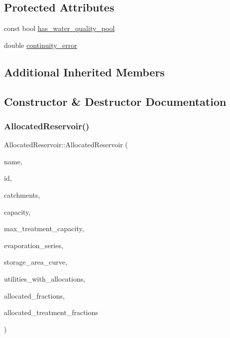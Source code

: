 \subsection*{Protected Attributes}
\begin{DoxyCompactItemize}
\item 
const bool \mbox{\hyperlink{classAllocatedReservoir_af6a1924f60de19b7f77781af0419c39b}{has\+\_\+water\+\_\+quality\+\_\+pool}}
\item 
double \mbox{\hyperlink{classAllocatedReservoir_ae34d7123ff096d676609e32ba4b83e47}{continuity\+\_\+error}}
\end{DoxyCompactItemize}
\subsection*{Additional Inherited Members}


\subsection{Constructor \& Destructor Documentation}
\mbox{\label{classAllocatedReservoir_a0b2d620a1d1fe9a9fe053269f35a9a70}} 
\subsubsection{\texorpdfstring{Allocated\+Reservoir()}{AllocatedReservoir()}\hspace{0.1cm}{\footnotesize\ttfamily [1/5]}}
{\footnotesize\ttfamily Allocated\+Reservoir\+::\+Allocated\+Reservoir (\begin{DoxyParamCaption}\item[{const char $\ast$}]{name,  }\item[{const int}]{id,  }\item[{const vector$<$ \mbox{\hyperlink{classCatchment}{Catchment}} $\ast$$>$ \&}]{catchments,  }\item[{const double}]{capacity,  }\item[{const double}]{max\+\_\+treatment\+\_\+capacity,  }\item[{\mbox{\hyperlink{classEvaporationSeries}{Evaporation\+Series}} \&}]{evaporation\+\_\+series,  }\item[{\mbox{\hyperlink{classDataSeries}{Data\+Series}} $\ast$}]{storage\+\_\+area\+\_\+curve,  }\item[{vector$<$ int $>$ $\ast$}]{utilities\+\_\+with\+\_\+allocations,  }\item[{vector$<$ double $>$ $\ast$}]{allocated\+\_\+fractions,  }\item[{vector$<$ double $>$ $\ast$}]{allocated\+\_\+treatment\+\_\+fractions }\end{DoxyParamCaption})}

